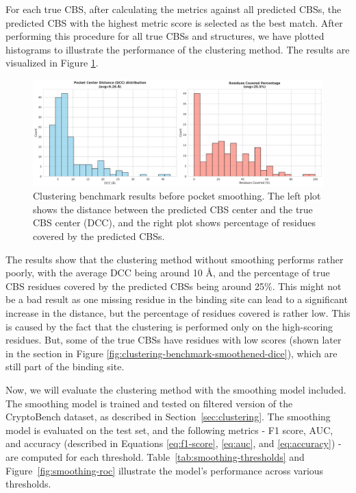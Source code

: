 For each true CBS, after calculating the metrics against all predicted CBSs, the predicted CBS with the highest metric score is selected as the best match. After performing this procedure for all true CBSs and structures, we have plotted histograms to illustrate the performance of the clustering method. The results are visualized in Figure \ref{fig:clustering-benchmark}.

\begin{figure}[htbp]
    \centering
    \includegraphics[width=\textwidth]{img/non-smoothened-1.pdf}
    \caption{Clustering benchmark results before pocket smoothing. The left plot shows the distance between the predicted CBS center and the true CBS center (DCC), and the right plot shows percentage of residues covered by the predicted CBSs.}
    \label{fig:clustering-benchmark}
\end{figure}

The results show that the clustering method without smoothing performs rather poorly, with the average DCC being around 10 \AA, and the percentage of true CBS residues covered by the predicted CBSs being around 25\%. This might not be a bad result as one missing residue in the binding site can lead to a significant increase in the distance, but the percentage of residues covered is rather low. This is caused by the fact that the clustering is performed only on the high-scoring residues. But, some of the true CBSs have residues with low scores (shown later in the section in Figure \ref{fig:clustering-benchmark-smoothened-dice}), which are still part of the binding site.

Now, we will evaluate the clustering method with the smoothing model included. The smoothing model is trained and tested on filtered version of the CryptoBench dataset, as described in Section~\ref{sec:clustering}. The smoothing model is evaluated on the test set, and the following metrics - F1 score, AUC, and accuracy (described in Equations \ref{eq:f1-score}, \ref{eq:auc}, and \ref{eq:accuracy}) - are computed for each threshold. Table~\ref{tab:smoothing-thresholds} and Figure~\ref{fig:smoothing-roc} illustrate the model's performance across various thresholds.

